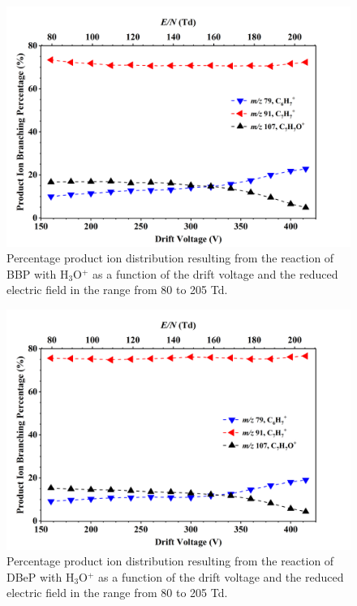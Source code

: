 \begin{figure}[htbp]
\centering
\includegraphics[height=0.4\textheight]{pics/BBP-BR.png}
\caption{Percentage product ion distribution resulting from the reaction of BBP with H$_3$O$^+$ as a function of the drift voltage and the reduced electric field in the range from 80 to 205 Td.}
\label{fig:PH_BBP_fs}
\end{figure}

\begin{figure}[htbp]
\centering
\includegraphics[height=0.4\textheight]{pics/DBeP-BR.png}
\caption{Percentage product ion distribution resulting from the reaction of DBeP with H$_3$O$^+$ as a function of the drift voltage and the reduced electric field in the range from 80 to 205 Td.}
\label{fig:PH_DBeP_fs}
\end{figure}


